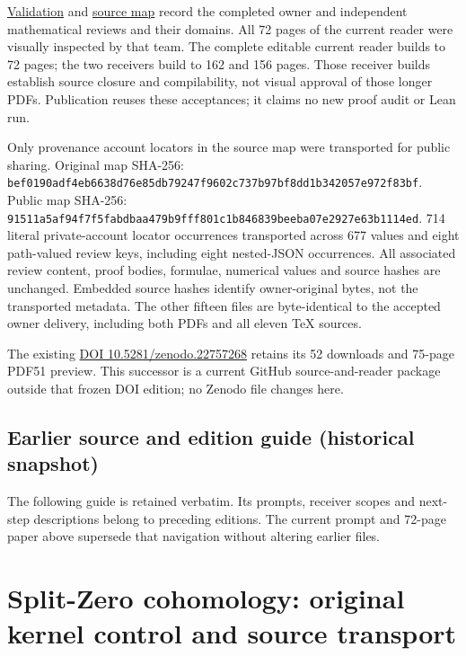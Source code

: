 \documentclass[
]{article}
\begin{document}
\href{workbenches/splitzero-tandem/continuations/20260914-original-kernel-matrices/12_VALIDATION.md}{Validation}
and
\href{workbenches/splitzero-tandem/continuations/20260914-original-kernel-matrices/11_SOURCE_MAP.json}{source
map} record the completed owner and independent mathematical reviews and
their domains. All 72 pages of the current reader were visually
inspected by that team. The complete editable current reader builds to
72 pages; the two receivers build to 162 and 156 pages. Those receiver
builds establish source closure and compilability, not visual approval
of those longer PDFs. Publication reuses these acceptances; it claims no
new proof audit or Lean run.

Only provenance account locators in the source map were transported for
public sharing. Original map SHA-256:
\texttt{bef0190adf4eb6638d76e85db79247f9602c737b97bf8dd1b342057e972f83bf}.
Public map SHA-256:
\texttt{91511a5af94f7f5fabdbaa479b9fff801c1b846839beeba07e2927e63b1114ed}.
714 literal private-account locator occurrences transported across 677
values and eight path-valued review keys, including eight nested-JSON
occurrences. All associated review content, proof bodies, formulae,
numerical values and source hashes are unchanged. Embedded source hashes
identify owner-original bytes, not the transported metadata. The other
fifteen files are byte-identical to the accepted owner delivery,
including both PDFs and all eleven TeX sources.

The existing \href{https://doi.org/10.5281/zenodo.22757268}{DOI
10.5281/zenodo.22757268} retains its 52 downloads and 75-page PDF51
preview. This successor is a current GitHub source-and-reader package
outside that frozen DOI edition; no Zenodo file changes here.

\subsection{Earlier source and edition guide (historical
snapshot)}\label{earlier-source-and-edition-guide-historical-snapshot-15}

The following guide is retained verbatim. Its prompts, receiver scopes
and next-step descriptions belong to preceding editions. The current
prompt and 72-page paper above supersede that navigation without
altering earlier files.

\section{Split-Zero cohomology: original kernel control and source
transport}\label{split-zero-cohomology-original-kernel-control-and-source-transport}
\end{document}
